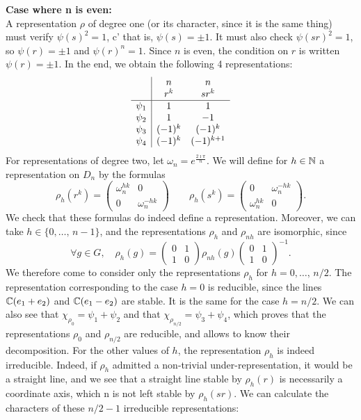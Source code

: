  
\textbf{Case where n is even:} \\A representation $ \rho $ of degree one (or its character, since it is the same thing) must verify $ \psi (s)^2 = 1 $, c' that is, $ \psi (s) = \pm 1 $. It must also check $ \psi (sr)^2 = 1 $, so $ \psi (r) = \pm 1 $ and $ \psi (r)^n = 1 $. Since $ n $ is even, the condition on $ r $ is written $ \psi (r) = \pm 1 $. In the end, we obtain the following 4 representations:
\begin{equation*}
\begin{array}{c | cc} & n & n \\& r^k & sr^k \\\hline \psi_1 & 1 & 1 \\\psi_2 & 1 & -1 \\\psi_3 & (-1)^k & (-1 )^k \\\psi_4 & (-1)^k & (-1)^{k + 1} \end{array}
\end{equation*}
For representations of degree two, let $ \omega_n = e^{\frac{2 \imath \pi}{n}} $. We will define for $ h \in \mathbb{N} $ a representation on $ D_n $ by the formulas
\begin{equation*}
\rho_h (r^k) = \begin{pmatrix} \omega_n^{hk} & 0 \\0 & \omega_n^{- hk} \end{pmatrix} \quad \quad \rho_h (s^k) = \begin{pmatrix} 0 & \omega_n^{- hk} \\\omega_n^{hk} & 0 \end{pmatrix}.
\end{equation*}
We check that these formulas do indeed define a representation. Moreover, we can take $ h \in \{0, \ldots, \, n-1\} $, and the representations $ \rho_h $ and $ \rho_{nh} $ are isomorphic, since
\begin{equation*}
\forall g \in G, \quad \rho_h (g) = \begin{pmatrix} 0 & 1 \\1 & 0 \end{pmatrix} \rho_{nh} (g) \begin{pmatrix} 0 & 1 \\1 & 0 \end{pmatrix}^{-1}.
\end{equation*}
We therefore come to consider only the representations $ \rho_h $ for $ h = 0, \ldots, \, n / 2 $. The representation corresponding to the case $ h = 0 $ is reducible, since the lines $ \mathbb{C} (e_1 + e_2) $ and $ \mathbb{C} (e_1 - e_2) $ are stable. It is the same for the case $ h = n / 2 $. We can also see that $ \chi_{\rho_0} = \psi_1 + \psi_2 $ and that $ \chi_{\rho_{n / 2}} = \psi_3 + \psi_4 $, which proves that the representations $ \rho_0 $ and $ \rho_{n / 2} $ are reducible, and allows to know their decomposition. For the other values of $ h $, the representation $ \rho_h $ is indeed irreducible. Indeed, if $ \rho_h $ admitted a non-trivial under-representation, it would be a straight line, and we see that a straight line stable by $ \rho_h (r) $ is necessarily a coordinate axis, which n is not left stable by $ \rho_h (sr) $. We can calculate the characters of these $ n / 2-1 $ irreducible representations:

